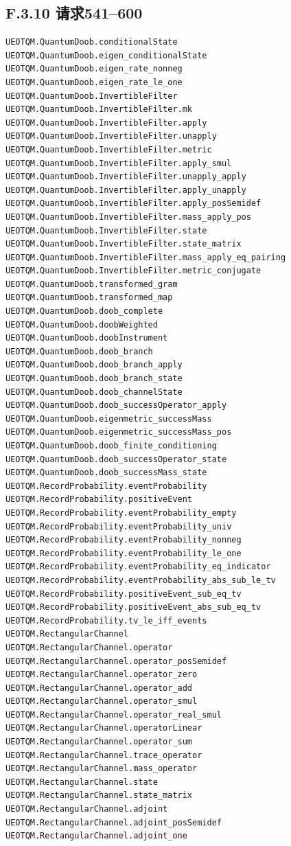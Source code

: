 \documentclass[
  11pt,
  oneside]{book}
\begin{document}
\subsection{F.3.10 请求541--600}

\begin{Verbatim}[breaklines,breakanywhere,fontsize=\scriptsize]
UEOTQM.QuantumDoob.conditionalState
UEOTQM.QuantumDoob.eigen_conditionalState
UEOTQM.QuantumDoob.eigen_rate_nonneg
UEOTQM.QuantumDoob.eigen_rate_le_one
UEOTQM.QuantumDoob.InvertibleFilter
UEOTQM.QuantumDoob.InvertibleFilter.mk
UEOTQM.QuantumDoob.InvertibleFilter.apply
UEOTQM.QuantumDoob.InvertibleFilter.unapply
UEOTQM.QuantumDoob.InvertibleFilter.metric
UEOTQM.QuantumDoob.InvertibleFilter.apply_smul
UEOTQM.QuantumDoob.InvertibleFilter.unapply_apply
UEOTQM.QuantumDoob.InvertibleFilter.apply_unapply
UEOTQM.QuantumDoob.InvertibleFilter.apply_posSemidef
UEOTQM.QuantumDoob.InvertibleFilter.mass_apply_pos
UEOTQM.QuantumDoob.InvertibleFilter.state
UEOTQM.QuantumDoob.InvertibleFilter.state_matrix
UEOTQM.QuantumDoob.InvertibleFilter.mass_apply_eq_pairing
UEOTQM.QuantumDoob.InvertibleFilter.metric_conjugate
UEOTQM.QuantumDoob.transformed_gram
UEOTQM.QuantumDoob.transformed_map
UEOTQM.QuantumDoob.doob_complete
UEOTQM.QuantumDoob.doobWeighted
UEOTQM.QuantumDoob.doobInstrument
UEOTQM.QuantumDoob.doob_branch
UEOTQM.QuantumDoob.doob_branch_apply
UEOTQM.QuantumDoob.doob_branch_state
UEOTQM.QuantumDoob.doob_channelState
UEOTQM.QuantumDoob.doob_successOperator_apply
UEOTQM.QuantumDoob.eigenmetric_successMass
UEOTQM.QuantumDoob.eigenmetric_successMass_pos
UEOTQM.QuantumDoob.doob_finite_conditioning
UEOTQM.QuantumDoob.doob_successOperator_state
UEOTQM.QuantumDoob.doob_successMass_state
UEOTQM.RecordProbability.eventProbability
UEOTQM.RecordProbability.positiveEvent
UEOTQM.RecordProbability.eventProbability_empty
UEOTQM.RecordProbability.eventProbability_univ
UEOTQM.RecordProbability.eventProbability_nonneg
UEOTQM.RecordProbability.eventProbability_le_one
UEOTQM.RecordProbability.eventProbability_eq_indicator
UEOTQM.RecordProbability.eventProbability_abs_sub_le_tv
UEOTQM.RecordProbability.positiveEvent_sub_eq_tv
UEOTQM.RecordProbability.positiveEvent_abs_sub_eq_tv
UEOTQM.RecordProbability.tv_le_iff_events
UEOTQM.RectangularChannel
UEOTQM.RectangularChannel.operator
UEOTQM.RectangularChannel.operator_posSemidef
UEOTQM.RectangularChannel.operator_zero
UEOTQM.RectangularChannel.operator_add
UEOTQM.RectangularChannel.operator_smul
UEOTQM.RectangularChannel.operator_real_smul
UEOTQM.RectangularChannel.operatorLinear
UEOTQM.RectangularChannel.operator_sum
UEOTQM.RectangularChannel.trace_operator
UEOTQM.RectangularChannel.mass_operator
UEOTQM.RectangularChannel.state
UEOTQM.RectangularChannel.state_matrix
UEOTQM.RectangularChannel.adjoint
UEOTQM.RectangularChannel.adjoint_posSemidef
UEOTQM.RectangularChannel.adjoint_one
\end{Verbatim}
\end{document}
